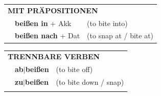 \documentclass[10pt,a4paper]{revtex4-2}
\begin{document}
\begin{verbbox}
   \vspace{10pt}

   \begin{tabular}{lll}
      \multicolumn{3}{l}{\textbf{MIT PRÄPOSITIONEN}}\\
& \textbf{beißen in} + Akk & (to bite into)\\
& \textbf{beißen nach} + Dat & (to snap at / bite at)\\
\end{tabular}
  \hfill
   \begin{tabular}{lll}
      \multicolumn{3}{l}{\textbf{TRENNBARE VERBEN}}\\
 & \textbf{ab$|$beißen} & (to bite off)\\
 & \textbf{zu$|$beißen} & (to bite down / snap)\\
\vspace{10pt}
  \end{tabular}

  \vspace{-5pt}

\end{verbbox}
\end{document}
